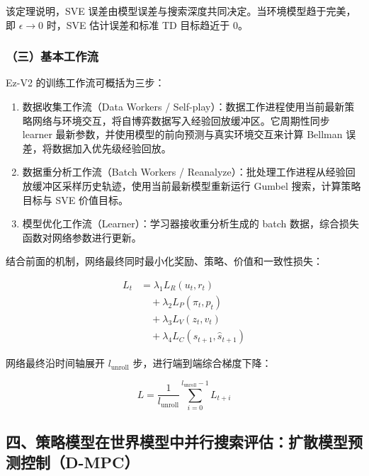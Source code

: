 该定理说明，SVE 误差由模型误差与搜索深度共同决定。当环境模型趋于完美，即 \(\epsilon \to 0\) 时，SVE 估计误差和标准 TD 目标趋近于 0。

\hypertarget{ux4e09ux57faux672cux5de5ux4f5cux6d41}{%
\subsubsection{（三）基本工作流}\label{ux4e09ux57faux672cux5de5ux4f5cux6d41}}

Ez-V2 的训练工作流可概括为三步：

\begin{enumerate}
\def\labelenumi{\arabic{enumi}.}
\tightlist
\item
  数据收集工作流（Data Workers / Self-play）：数据工作进程使用当前最新策略网络与环境交互，将自博弈数据写入经验回放缓冲区。它周期性同步 learner 最新参数，并使用模型的前向预测与真实环境交互来计算 Bellman 误差，将数据加入优先级经验回放。
\item
  数据重分析工作流（Batch Workers / Reanalyze）：批处理工作进程从经验回放缓冲区采样历史轨迹，使用当前最新模型重新运行 Gumbel 搜索，计算策略目标与 SVE 价值目标。
\item
  模型优化工作流（Learner）：学习器接收重分析生成的 batch 数据，综合损失函数对网络参数进行更新。
\end{enumerate}

结合前面的机制，网络最终同时最小化奖励、策略、价值和一致性损失：

\[
\begin{aligned}
L_t
&= \lambda_1 L_R(u_t, r_t)
\\
&\quad + \lambda_2 L_P(\pi_t, p_t)
\\
&\quad + \lambda_3 L_V(z_t, v_t)
\\
&\quad + \lambda_4 L_C(s_{t+1}, \hat{s}_{t+1})
\end{aligned}
\]

网络最终沿时间轴展开 \(l_{\mathrm{unroll}}\) 步，进行端到端综合梯度下降：

\[
L
= \frac{1}{l_{\mathrm{unroll}}}
\sum_{i=0}^{l_{\mathrm{unroll}}-1}
L_{t+i}
\]

\hypertarget{ux56dbux7b56ux7565ux6a21ux578bux5728ux4e16ux754cux6a21ux578bux4e2dux5e76ux884cux641cux7d22ux8bc4ux4f30ux6269ux6563ux6a21ux578bux9884ux6d4bux63a7ux5236d-mpc}{%
\subsection{四、策略模型在世界模型中并行搜索评估：扩散模型预测控制（D-MPC）}\label{ux56dbux7b56ux7565ux6a21ux578bux5728ux4e16ux754cux6a21ux578bux4e2dux5e76ux884cux641cux7d22ux8bc4ux4f30ux6269ux6563ux6a21ux578bux9884ux6d4bux63a7ux5236d-mpc}}

